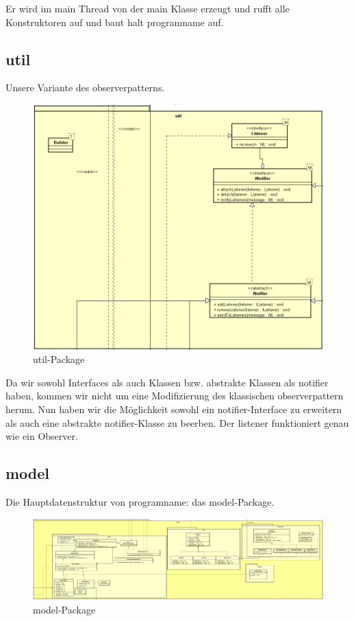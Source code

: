 Er wird im main Thread von der main Klasse erzeugt und rufft alle Konstruktoren auf
und baut halt \gls{programname} auf.

\subsection{util}
\label{subsec:util}

Unsere Variante des \gls{observerpattern}s.

\begin{figure}[H]
  \centering
  \includegraphics[width=\textwidth]{../diagramimages/util.png}
  \caption{util-Package}
\end{figure}

Da wir sowohl Interfaces als auch Klassen bzw. abstrakte Klassen als
\gls{notifier} haben, kommen wir nicht um eine Modifizierung des klassischen
\gls{observerpattern} herum. Nun haben wir die Möglichkeit sowohl ein
\gls{notifier}-Interface zu erweitern als auch eine abstrakte
\gls{notifier}-Klasse zu beerben. Der \gls{listener} funktioniert genau wie ein
Observer.


\subsection{model}
\label{subsec:model}

Die Hauptdatenstruktur von \gls{programname}: das model-Package.

\begin{figure}[H]
  \centering
  \includegraphics[width=\textwidth]{../diagramimages/model.png}
  \caption{model-Package}
\end{figure}

